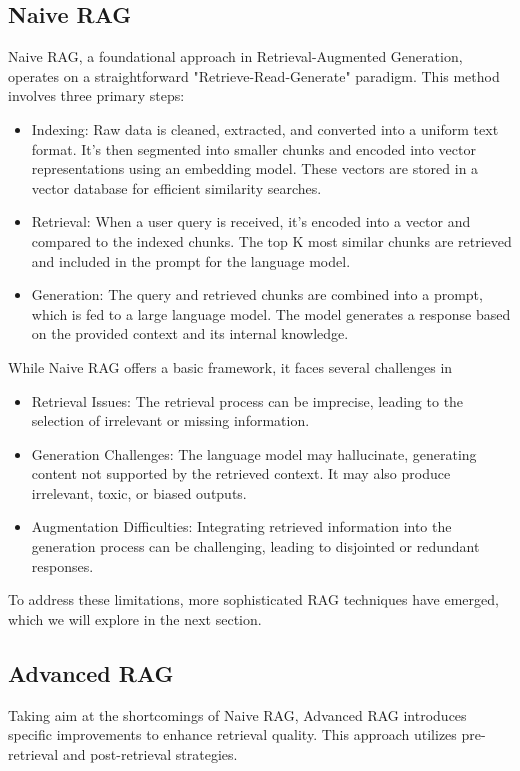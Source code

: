 \subsection{Naive RAG}
Naive RAG, a foundational approach in Retrieval-Augmented Generation, operates on a straightforward "Retrieve-Read-Generate" paradigm. This method involves three primary steps:

\begin{itemize}
	\item Indexing: Raw data is cleaned, extracted, and converted into a uniform text format. It's then segmented into smaller chunks and encoded into vector representations using an embedding model. These vectors are stored in a vector database for efficient similarity searches.
	\item Retrieval: When a user query is received, it's encoded into a vector and compared to the indexed chunks. The top K most similar chunks are retrieved and included in the prompt for the language model.
	\item Generation: The query and retrieved chunks are combined into a prompt, which is fed to a large language model. The model generates a response based on the provided context and its internal knowledge.
\end{itemize}
While Naive RAG offers a basic framework, it faces several challenges in 
\begin{itemize}
	\item Retrieval Issues: The retrieval process can be imprecise, leading to the selection of irrelevant or missing information.
	\item Generation Challenges: The language model may hallucinate, generating content not supported by the retrieved context. It may also produce irrelevant, toxic, or biased outputs.
	\item Augmentation Difficulties: Integrating retrieved information into the generation process can be challenging, leading to disjointed or redundant responses.
\end{itemize}
To address these limitations, more sophisticated RAG techniques have emerged, which we will explore in the next section.
\subsection{Advanced RAG}
Taking aim at the shortcomings of Naive RAG, Advanced RAG introduces specific improvements to enhance retrieval quality. This approach utilizes pre-retrieval and post-retrieval strategies.
